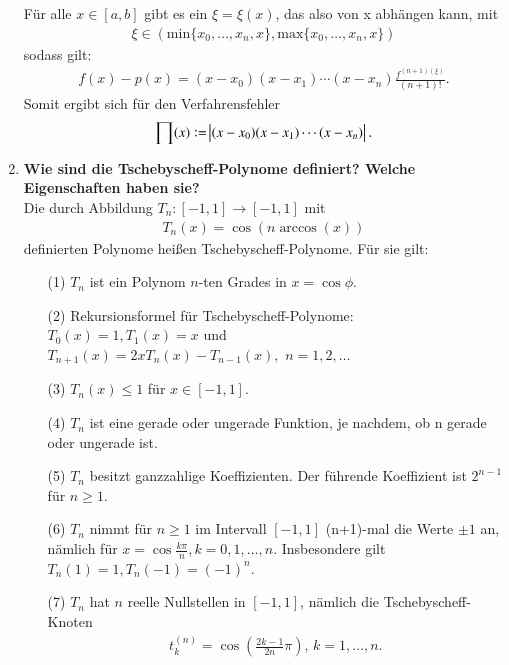 \begin{enumerate}
			Für alle \( x\in[a,b] \) gibt es ein \( \xi=\xi(x) \), das also von x abhängen kann, mit
			\begin{align*}
				\xi \in \left( \text{min}\{x_0,\dots,x_n,x \}, \text{max}\{x_0,\dots,x_n,x \} \right)
			\end{align*}
			sodass gilt:
			\begin{align*}
				f(x)-p(x)=(x-x_0)(x-x_1)\cdots(x-x_n)\frac{f^{(n+1)\left(\xi\right)}}{(n+1)!}.
			\end{align*}
			Somit ergibt sich für den Verfahrensfehler
			\begin{align*}
				\prod(x):=\abs{(x-x_0)(x-x_1)\cdots(x-x_n)}.
			\end{align*}
			
		\pagebreak
			
		\item \textbf{Wie sind die Tschebyscheff-Polynome definiert? Welche Eigenschaften haben sie?} \\
			Die durch Abbildung \(T_n:[-1,1]\rightarrow[-1,1]\) mit
			\begin{align*}
				T_n(x)=\cos(n\arccos(x))
			\end{align*}
			definierten Polynome heißen Tschebyscheff-Polynome. Für sie gilt:
			\begin{enumerate}
				\item[(1)] \(T_n\) ist ein Polynom \(n\)-ten Grades in \(x=\cos\phi\).
				\item[(2)] Rekursionsformel für Tschebyscheff-Polynome:\\
						\(T_0(x)=1, T_1(x)=x\) und \(T_{n+1}(x)=2xT_n(x)-T_{n-1}(x),\,\, n=1,2,\dots\)
				\item[(3)] \(T_n(x)\leq1\) für \(x\in[-1,1] \).
				\item[(4)] \(T_n\) ist eine gerade oder ungerade Funktion, je nachdem, ob n gerade oder ungerade ist.
				\item[(5)] \(T_n\) besitzt ganzzahlige Koeffizienten. Der führende Koeffizient ist \(2^{n-1}\) für \(n\geq1\).
				\item[(6)] \(T_n\) nimmt für \(n\geq 1\) im Intervall \([-1,1]\) (n+1)-mal die Werte \(\pm1\) an, nämlich für \(x=\cos\frac{k\pi}{n},k=0,1,\dots,n\). Insbesondere gilt \(T_n(1)=1, T_n(-1)=(-1)^n\).
				\item[(7)] \(T_n\) hat \(n\) reelle Nullstellen in \([-1,1]\), nämlich die Tschebyscheff-Knoten
					\begin{align*}
						t_k^{(n)}=\cos\left( \frac{2k-1}{2n}\pi \right),\, k=1,\dots,n. 
					\end{align*}

\end{enumerate}
\end{enumerate}

